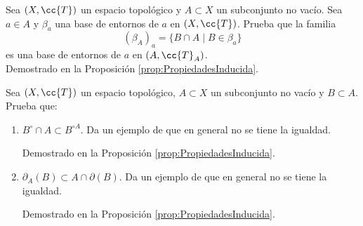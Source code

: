 \begin{ejercicio}
    Sea $(X,\cc{T})$ un espacio topológico y $A\subset X$ un subconjunto no vacío. Sea $a\in A$ y $\beta_a$ una base de entornos de $a$ en $(X,\cc{T})$. Prueba que la familia
    \begin{equation*}
        (\beta_A)_a = \{B\cap A\mid B\in \beta_a\}
    \end{equation*}
    es una base de entornos de $a$ en $(A,\cc{T}_A)$.\\

    Demostrado en la Proposición \ref{prop:PropiedadesInducida}.
\end{ejercicio}

\begin{ejercicio}
    Sea $(X,\cc{T})$ un espacio topológico, $A\subset X$ un subconjunto no vacío y $B\subset A$. Prueba que:
    \begin{enumerate}
        \item $B^\circ \cap A \subset B^{\circ A}$. Da un ejemplo de que en general no se tiene la igualdad.

        Demostrado en la Proposición \ref{prop:PropiedadesInducida}.
            
        \item $\partial_A(B)\subset A\cap \partial(B)$. Da un ejemplo de que en general no se tiene la igualdad.

        Demostrado en la Proposición \ref{prop:PropiedadesInducida}.
    \end{enumerate}
\end{ejercicio}

